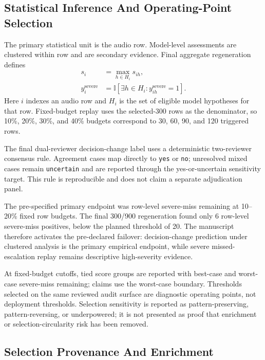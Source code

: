 \documentclass[
]{article}
\begin{document}
\hypertarget{statistical-inference-and-operating-point-selection}{%
\subsection{Statistical Inference And Operating-Point
Selection}\label{statistical-inference-and-operating-point-selection}}

The primary statistical unit is the audio row. Model-level assessments
are clustered within row and are secondary evidence. Final aggregate
regeneration defines
\[
\begin{aligned}
s_i &= \max_{h \in H_i} s_{ih},\\
y^{\mathrm{severe}}_i
&=
\mathbb{I}\!\left[
  \exists h \in H_i:
  y^{\mathrm{severe}}_{ih}=1
\right].
\end{aligned}
\]
Here \(i\) indexes an audio row and \(H_i\) is the set of eligible
model hypotheses for that row. Fixed-budget replay
uses the selected-300 rows as the denominator, so 10\%, 20\%, 30\%, and
40\% budgets correspond to 30, 60, 90, and 120 triggered rows.

The final dual-reviewer decision-change label uses a deterministic
two-reviewer consensus rule. Agreement cases map directly to
\texttt{yes} or \texttt{no}; unresolved mixed cases remain
\texttt{uncertain} and are reported through the yes-or-uncertain
sensitivity target. This rule is reproducible and does not claim a
separate adjudication panel.

The pre-specified primary endpoint was row-level severe-miss remaining
at 10--20\% fixed row budgets. The final 300/900 regeneration found only
6 row-level severe-miss positives, below the planned threshold of 20.
The manuscript therefore activates the pre-declared failover:
decision-change prediction under clustered analysis is the primary
empirical endpoint, while severe missed-escalation replay remains
descriptive high-severity evidence.

At fixed-budget cutoffs, tied score groups are reported with best-case
and worst-case severe-miss remaining; claims use the worst-case
boundary. Thresholds selected on the same reviewed audit surface are
diagnostic operating points, not deployment thresholds. Selection
sensitivity is reported as pattern-preserving, pattern-reversing, or
underpowered; it is not presented as proof that enrichment or
selection-circularity risk has been removed.

\hypertarget{selection-provenance-and-enrichment}{%
\subsection{Selection Provenance And
Enrichment}\label{selection-provenance-and-enrichment}}
\end{document}
